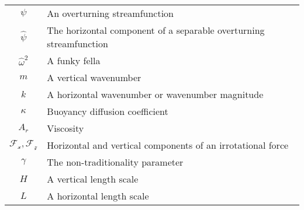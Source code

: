 \begin{tabular}{cp{\textwidth}}
    $\psi$ & An overturning streamfunction \\
    $\hat{\psi}$ & The horizontal component of a separable overturning streamfunction \\
    $\hat{\omega}^2$ & A funky fella \\
    $m$ & A vertical wavenumber \\
    $k$ & A horizontal wavenumber or wavenumber magnitude \\
    $\kappa$ & Buoyancy diffusion coefficient \\
    $A_r$ & Viscosity \\
    $\mathcal{F_x}, \mathcal{F_z}$ & Horizontal and vertical components of an irrotational force \\
    $\gamma$ & The non-traditionality parameter \\
    $H$ & A vertical length scale \\
    $L$ & A horizontal length scale \\
  \end{tabular}